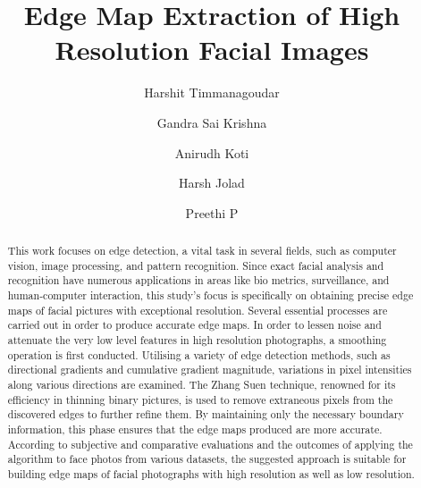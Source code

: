 \documentclass{70_styles/svproc}
\begin{document}
\mainmatter 

\title{Edge Map Extraction of High Resolution Facial Images}

\author{Harshit Timmanagoudar \and Gandra Sai Krishna \and Anirudh Koti \and Harsh Jolad \and Preethi P}

\maketitle 

\begin{abstract}
This work focuses on edge detection, a vital task in several fields, such as computer vision, image processing, and pattern recognition. Since exact facial analysis and recognition have numerous applications in areas like bio metrics, surveillance, and human-computer interaction, this study's focus is specifically on obtaining precise edge maps of facial pictures with exceptional resolution. Several essential processes are carried out in order to produce accurate edge maps. In order to lessen noise and attenuate the very low level features in high resolution photographs, a smoothing operation is first conducted. Utilising a variety of edge detection methods, such as directional gradients and cumulative gradient magnitude, variations in pixel intensities along various directions are examined. The Zhang Suen technique, renowned for its efficiency in thinning binary pictures, is used to remove extraneous pixels from the discovered edges to further refine them. By maintaining only the necessary boundary information, this phase ensures that the edge maps produced are more accurate. According to subjective and comparative evaluations and the outcomes of applying the algorithm to face photos from various datasets, the suggested approach is suitable for building edge maps of facial photographs with high resolution as well as low resolution.
\end{abstract}
\end{document}
